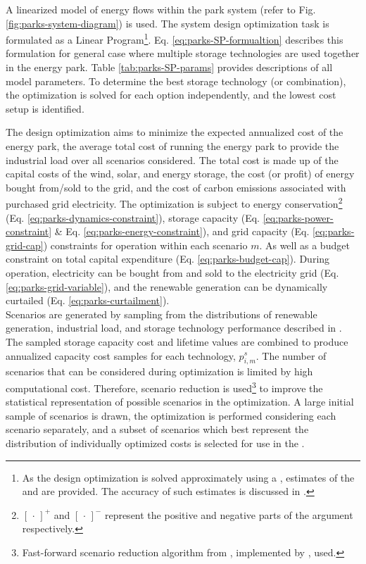 A linearized model of energy flows within the park system (refer to Fig. \ref{fig:parks-system-diagram}) is used. The system design optimization task is formulated as a Linear Program\footnote{As the design optimization is solved approximately using a , estimates of the  and  are provided. The accuracy of such estimates is discussed in .}. Eq. \ref{eq:parks-SP-formualtion} describes this formulation for general case where multiple storage technologies are used together in the energy park. Table \ref{tab:parks-SP-params} provides descriptions of all model parameters. To determine the best storage technology (or combination), the optimization is solved for each option independently, and the lowest cost setup is identified.

The design optimization aims to minimize the expected annualized cost of the energy park, the average total cost of running the energy park to provide the industrial load over all scenarios considered. The total cost is made up of the capital costs of the wind, solar, and energy storage, the cost (or profit) of energy bought from/sold to the grid, and the cost of carbon emissions associated with purchased grid electricity.
The optimization is subject to energy conservation\footnote{$[\,\cdot\,]^+$ and $[\,\cdot\,]^-$ represent the positive and negative parts of the argument respectively.} (Eq. \ref{eq:parks-dynamics-constraint}), storage capacity (Eq. \ref{eq:parks-power-constraint} \& Eq. \ref{eq:parks-energy-constraint}), and grid capacity (Eq. \ref{eq:parks-grid-cap}) constraints for operation within each scenario $m$. As well as a budget constraint on total capital expenditure (Eq. \ref{eq:parks-budget-cap}). During operation, electricity can be bought from and sold to the electricity grid (Eq. \ref{eq:parks-grid-variable}), and the renewable generation can be dynamically curtailed (Eq. \ref{eq:parks-curtailment}).\\

Scenarios are generated by sampling from the distributions of renewable generation, industrial load, and storage technology performance described in . The sampled storage capacity cost and lifetime values are combined to produce annualized capacity cost samples for each technology, $p^s_{i,m}$.
The number of scenarios that can be considered during optimization is limited by high computational cost. Therefore, scenario reduction \citep{pickering2019PracticalOptimisationDistrict} is used\footnote{Fast-forward scenario reduction algorithm from \citep{heitsch2003ScenarioReductionAlgorithms}, implemented by \citep{gioia2023ScenarioReducer}, used.} to improve the statistical representation of possible scenarios in the optimization. A large initial sample of scenarios is drawn, the optimization is performed considering each scenario separately, and a subset of scenarios which best represent the distribution of individually optimized costs is selected for use in the .

